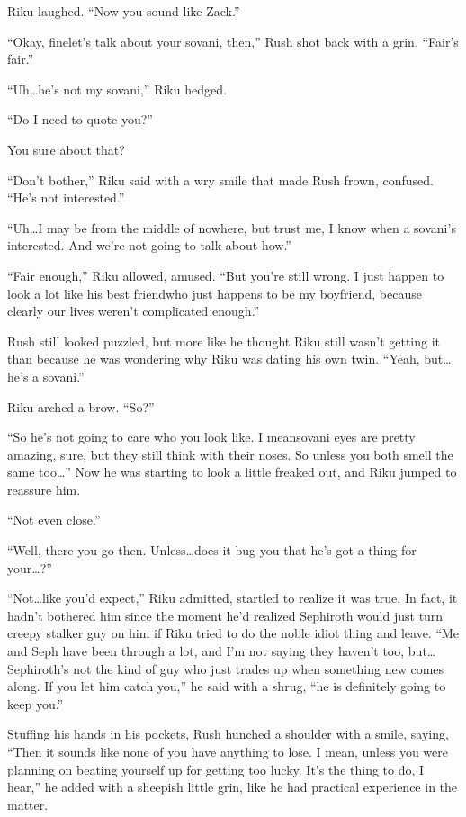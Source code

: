 Riku laughed. ``Now you sound like Zack.''

``Okay, fine\textemdash let's talk about your sovani, then,'' Rush shot back with a grin. ``Fair's fair.''

``Uh\ldots he's not my sovani,'' Riku hedged.

``Do I need to quote you?''

You sure about that?

``Don't bother,'' Riku said with a wry smile that made Rush frown, confused. ``He's not interested.''

``Uh\ldots I may be from the middle of nowhere, but trust me, I know when a sovani's interested. And we're not going to talk about how.''

``Fair enough,'' Riku allowed, amused. ``But you're still wrong. I just happen to look a lot like his best friend\textemdash who just happens to be my boyfriend, because clearly our lives weren't complicated enough.''

Rush still looked puzzled, but more like he thought Riku still wasn't getting it than because he was wondering why Riku was dating his own twin. ``Yeah, but\ldots he's a sovani.''

Riku arched a brow. ``So?''

``So he's not going to care who you look like. I mean\textemdash sovani eyes are pretty amazing, sure, but they still think with their noses. So unless you both smell the same too\ldots '' Now he was starting to look a little freaked out, and Riku jumped to reassure him.

``Not even close.''

``Well, there you go then. Unless\ldots does it bug you that he's got a thing for your\ldots ?''

``Not\ldots like you'd expect,'' Riku admitted, startled to realize it was true. In fact, it hadn't bothered him since the moment he'd realized Sephiroth would just turn creepy stalker guy on him if Riku tried to do the noble idiot thing and leave. ``Me and Seph have been through a lot, and I'm not saying they haven't too, but\ldots Sephiroth's not the kind of guy who just trades up when something new comes along. If you let him catch you,'' he said with a shrug, ``he is definitely going to keep you.''

Stuffing his hands in his pockets, Rush hunched a shoulder with a smile, saying, ``Then it sounds like none of you have anything to lose. I mean, unless you were planning on beating yourself up for getting too lucky. It's the thing to do, I hear,'' he added with a sheepish little grin, like he had practical experience in the matter.

